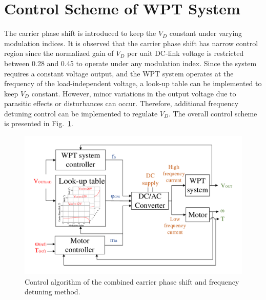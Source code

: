 \documentclass[journal]{IEEEtran}
\begin{document}
\section{Control Scheme of WPT System}
The carrier phase shift is introduced to keep the $V_D$ constant under varying modulation indices. 
It is observed that the carrier phase shift has narrow control region since the normalized gain of $V_D$ per unit DC-link voltage is restricted between 0.28 and 0.45 to operate under any modulation index. 
Since the system requires a constant voltage output, and the WPT system operates at the frequency of the load-independent voltage, a look-up table can be implemented to keep $V_D$ constant. 
However, minor variations in the output voltage due to parasitic effects or disturbances can occur. 
Therefore, additional frequency detuning control can be implemented to regulate  $V_D$. 
The overall control scheme is presented in Fig.~\ref{fig:control}.
\begin{figure}[h!]
    \centering
    \includegraphics[width=1\linewidth] {Controller3AC_v3.pdf}
    \caption{Control algorithm of the combined carrier phase shift and frequency detuning method.}
    \label{fig:control}
\end{figure}
\end{document}
